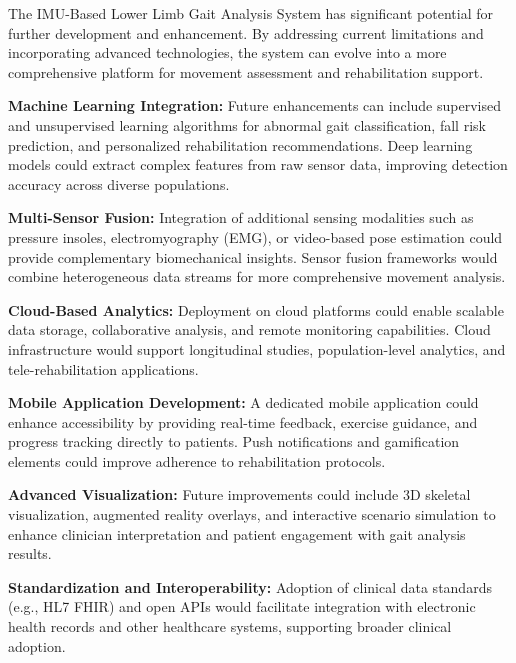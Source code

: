 \documentclass[12pt,a4paper]{report}
\begin{document}
The IMU-Based Lower Limb Gait Analysis System has significant potential for further development and enhancement. By addressing current limitations and incorporating advanced technologies, the system can evolve into a more comprehensive platform for movement assessment and rehabilitation support.

\textbf{Machine Learning Integration:}  
Future enhancements can include supervised and unsupervised learning algorithms for abnormal gait classification, fall risk prediction, and personalized rehabilitation recommendations. Deep learning models could extract complex features from raw sensor data, improving detection accuracy across diverse populations.

\vspace{0.3cm}

\textbf{Multi-Sensor Fusion:}  
Integration of additional sensing modalities such as pressure insoles, electromyography (EMG), or video-based pose estimation could provide complementary biomechanical insights. Sensor fusion frameworks would combine heterogeneous data streams for more comprehensive movement analysis.

\vspace{0.3cm}

\textbf{Cloud-Based Analytics:}  
Deployment on cloud platforms could enable scalable data storage, collaborative analysis, and remote monitoring capabilities. Cloud infrastructure would support longitudinal studies, population-level analytics, and tele-rehabilitation applications.

\vspace{0.3cm}

\textbf{Mobile Application Development:}  
A dedicated mobile application could enhance accessibility by providing real-time feedback, exercise guidance, and progress tracking directly to patients. Push notifications and gamification elements could improve adherence to rehabilitation protocols.

\vspace{0.3cm}

\textbf{Advanced Visualization:}  
Future improvements could include 3D skeletal visualization, augmented reality overlays, and interactive scenario simulation to enhance clinician interpretation and patient engagement with gait analysis results.

\vspace{0.3cm}

\textbf{Standardization and Interoperability:}  
Adoption of clinical data standards (e.g., HL7 FHIR) and open APIs would facilitate integration with electronic health records and other healthcare systems, supporting broader clinical adoption.
\end{document}
